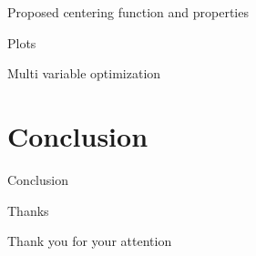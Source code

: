 \documentclass{beamer}
\begin{document}
\begin{frame}{Proposed centering function and properties}
\end{frame}

\begin{frame}%
  Plots
\end{frame}

\begin{frame}{Multi variable optimization}
\end{frame}



\section{Conclusion}

\begin{frame}{Conclusion}
\end{frame}

\begin{frame}{Thanks}
\end{frame}

\begin{frame}[standout]
  Thank you for your attention
\end{frame}
\end{document}

